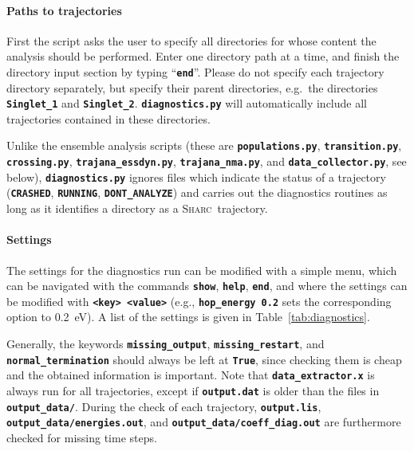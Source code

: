 \documentclass[a4paper,10pt,DIV=15,openany,twoside=false]{scrbook}
\newcommand{\sharc}{\textsc{Sharc}}
\newcommand{\ttt}[1]{\textbf{\texttt{#1}}}
\begin{document}
\paragraph{Paths to trajectories}

First the script asks the user to specify all directories for whose content the analysis should be performed. Enter one directory path at a time, and finish the directory input section by typing ``\ttt{end}''. Please do not specify each trajectory directory separately, but specify their parent directories, e.g.\ the directories \ttt{Singlet\_1} and \ttt{Singlet\_2}. \ttt{diagnostics.py} will automatically include all trajectories contained in these directories.

Unlike the ensemble analysis scripts (these are \ttt{populations.py}, \ttt{transition.py}, \ttt{crossing.py}, \ttt{trajana\_essdyn.py}, \ttt{trajana\_nma.py}, and \ttt{data\_collector.py}, see below), \ttt{diagnostics.py} ignores files which indicate the status of a trajectory (\ttt{CRASHED}, \ttt{RUNNING}, \ttt{DONT\_ANALYZE}) and carries out the diagnostics routines as long as it identifies a directory as a \sharc\ trajectory.

\paragraph{Settings}

The settings for the diagnostics run can be modified with a simple menu, which can be navigated with the commands \ttt{show}, \ttt{help}, \ttt{end}, and where the settings can be modified with \ttt{<key> <value>} (e.g., \ttt{hop\_energy 0.2} sets the corresponding option to 0.2~eV).
A list of the settings is given in Table~\ref{tab:diagnostics}.

Generally, the keywords \ttt{missing\_output}, \ttt{missing\_restart}, and \ttt{normal\_termination} should always be left at \ttt{True}, since checking them is cheap and the obtained information is important.
Note that \ttt{data\_extractor.x} is always run for all trajectories, except if \ttt{output.dat} is older than the files in \ttt{output\_data/}.
During the check of each trajectory, \ttt{output.lis}, \ttt{output\_data/energies.out}, and \ttt{output\_data/coeff\_diag.out} are furthermore checked for missing time steps.
\end{document}
